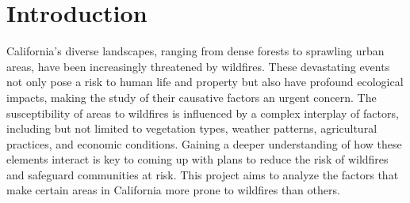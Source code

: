 \section{Introduction}

California's diverse landscapes, ranging from dense forests to sprawling urban areas, have been increasingly threatened by wildfires. These devastating events not only pose a risk to human life and property but also have profound ecological impacts, making the study of their causative factors an urgent concern. The susceptibility of areas to wildfires is influenced by a complex interplay of factors, including but not limited to vegetation types, weather patterns, agricultural practices, and economic conditions. Gaining a deeper understanding of how these elements interact is key to coming up with plans to reduce the risk of wildfires and safeguard communities at risk. This project aims to analyze the factors that make certain areas in California more prone to wildfires than others. 